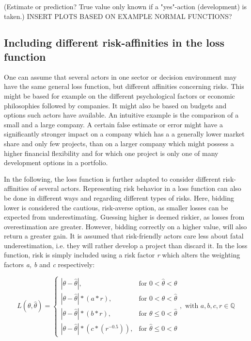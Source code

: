 		(Estimate or prediction? True value only known if a "yes"-action (development) is taken.)
		INSERT PLOTS BASED ON EXAMPLE NORMAL FUNCTIONS?
		
		\subsection{Including different risk-affinities in the loss function}
		
		One can assume that several actors in one sector or decision environment may have the same general loss function, but different affinities concerning risks. This might be based for example on the different psychological factors or economic philosophies followed by companies. It might also be based on budgets and options such actors have available. An intuitive example is the comparison of a small and a large company. A certain false estimate or error might have a significantly stronger impact on a company which has a a generally lower market share and only few projects, than on a larger company which might possess a higher financial flexibility and for which one project is only one of many development options in a portfolio.
		
		In the following, the loss function is further adapted to consider different risk-affinities of several actors. Representing risk behavior in a loss function can also be done in different ways and regarding different types of risks. Here, bidding lower is considered the cautious, risk-averse option, as smaller losses can be expected from underestimating. Guessing higher is deemed riskier, as losses from overestimation are greater. However, bidding correctly on a higher value, will also return a greater gain. It is assumed that risk-friendly actors care less about fatal underestimation, i.e. they will rather develop a project than discard it. In the loss function, risk is simply included using a risk factor \textit{r} which alters the weighting factors \textit{a, b} and \textit{c} respectively:
		
		\begin{equation}\label{eq:LFR_final}
		L(\theta,\hat{\theta}) =
		\begin{cases}
		|\theta - \hat{\theta}|, & \text{for } 0<\hat{\theta}<\theta  \\
		|\theta-\hat{\theta}|*(a*r), & \text{for } 0<\theta<\hat{\theta} \\
		|\theta-\hat{\theta}|*(b*r), & \text{for } \theta\leq0<\hat{\theta} \\
		|\theta-\hat{\theta}|*(c*(r^{-0.5})), & \text{for } \hat{\theta}\leq0<\theta 
		\end{cases},
		\text{ with } a,b,c,r \in \mathbb{Q}
		\end{equation}
		
